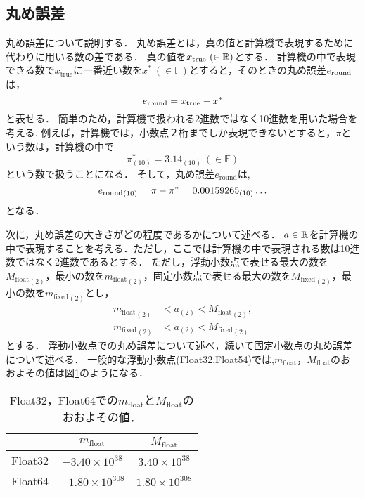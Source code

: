 \subsection{丸め誤差}
丸め誤差について説明する．
丸め誤差とは，真の値と計算機で表現するために代わりに用いる数の差である．
真の値を$x_{\mathrm{true}} \ (\in \mathbb{R})$とする．
計算機の中で表現できる数で$x_{\mathrm{true}}$に一番近い数を$x^{\ast} \ (\in \mathbb{F})$とすると，そのときの丸め誤差$e_{\mathrm{round}}$は，
\begin{equation*}
    e_{\mathrm{round}} = x_{\mathrm{true}} - x^{\ast}
\end{equation*}
と表せる．
簡単のため，計算機で扱われる2進数ではなく10進数を用いた場合を考える.
例えば，計算機では，小数点２桁までしか表現できないとすると，$\pi$という数は，計算機の中で
\begin{equation*}
    \pi^{\ast}_{(10)} = 3.14_{(10)} \ (\in \mathbb{F})
\end{equation*}
という数で扱うことになる．
そして，丸め誤差$e_{\mathrm{round}}$は,
\begin{equation*}
    {e_{\mathrm{round}}}_{(10)} = \pi - \pi^{\ast} = {0.00159265_{(10)}\dots}
\end{equation*}
となる．


次に，丸め誤差の大きさがどの程度であるかについて述べる．
$a \in \mathbb{R}$を計算機の中で表現することを考える．ただし，ここでは計算機の中で表現される数は10進数ではなく2進数であるとする．
ただし，浮動小数点で表せる最大の数を${M_{\mathrm{float}}}_{(2)}$，最小の数を${m_{\mathrm{float}}}_{(2)}$，固定小数点で表せる最大の数を${M_{\mathrm{fixed}}}_{(2)}$，最小の数を${m_{\mathrm{fixed}}}_{(2)}$とし，
\begin{align*}
   {m_{\mathrm{float}}}_{(2)} &< a_{(2)} < {M_{\mathrm{float}}}_{(2)}, \\
   {m_{\mathrm{fixed}}}_{(2)} &< a_{(2)} < {M_{\mathrm{fixed}}}_{(2)}
\end{align*}
とする．
浮動小数点での丸め誤差について述べ，続いて固定小数点の丸め誤差について述べる．
一般的な浮動小数点(Float32,Float54)では,$m_{\mathrm{float}}$，$M_{\mathrm{float}}$のおおよその値は図\ref{tab:float_max_min}のようになる．
\begin{table}[H]
    \centering
    \caption{Float32，Float64での$m_{\mathrm{float}}$と$M_{\mathrm{float}}$のおおよその値．}
    \begin{tabular}{c|c|c}
         & $m_{\mathrm{float}}$ & $M_{\mathrm{float}}$ \\ \hline \hline
         Float32 & $-3.40 \times 10^{38}$ & $3.40 \times 10^{38}$ \\ \hline
         Float64 & $-1.80 \times 10^{308}$ & $1.80 \times 10^{308}$
    \end{tabular}
    \label{tab:float_max_min}
\end{table}


